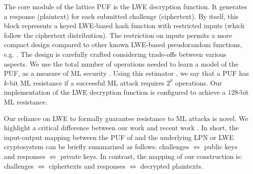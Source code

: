 \DIFdelend The core module of the lattice PUF is the LWE decryption function.
It generates a response (plaintext) for each submitted challenge (ciphertext). 
By itself, this block represents a keyed LWE-based hash function with restricted inputs (which follow the ciphertext distribution). 
The restriction on inputs permits a more compact design compared to other known LWE-based pseudorandom functions, e.g. \cite{brenner2014fpga}.
The design is carefully crafted considering trade-offs between various aspects.
We use the total number of operations needed to learn a model of the PUF, as a measure of ML security \cite{lindner2011better, micciancio2009lattice, albrecht2015concrete}. 
Using this estimator \cite{albrecht2015concrete}, we say that a PUF has $k$-bit ML resistance if a successful ML attack requires $2^k$ operations. 
Our implementation of the LWE decryption function is configured to achieve a $128$-bit ML resistance.

Our reliance on LWE to formally guarantee resistance to ML attacks is novel.
We highlight a critical difference between our work and recent work \cite{herder2017trapdoor,jin2017fpga}.
In short, the input-output mapping between the PUF of \cite{herder2017trapdoor,jin2017fpga} and the underlying LPN or LWE cryptosystem can be briefly summarized as follows: 
 challenges $\Longleftrightarrow$ public keys and responses $\Longleftrightarrow$  private keys. In contrast, the mapping of our construction is: challenges $\Longleftrightarrow$ ciphertexts and responses $\Longleftrightarrow$ decrypted plaintexts.

